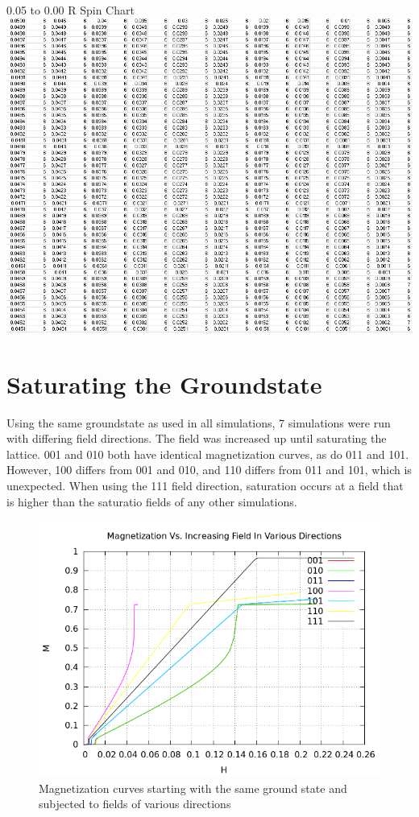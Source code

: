 \documentclass{article}
\begin{document}
\begin{center}
\LARGE 0.05 to 0.00 R Spin Chart
 \includegraphics[keepaspectratio,scale=0.7]{111_3000/005to000RSpinChart.png}
\end{center}
\clearpage

\section{Saturating the Groundstate}
Using the same groundstate as used in all simulations, 7 simulations were run with differing field directions. The 
field was increased up until saturating the lattice. 001 and 010 both have identical magnetization curves, as do
011 and 101. However, 100 differs from 001 and 010, and 110 differs from 011 and 101, which is unexpected. When using
the 111 field direction, saturation occurs at a field that is higher than the saturatio fields of any other simulations. 
\begin{figure}
 \centering
 \includegraphics[scale=0.5]{HVariedData/Increasing/IncreasingField.png}
 \caption{Magnetization curves starting with the same ground state and subjected to fields of various directions}
\end{figure}
\end{document}
